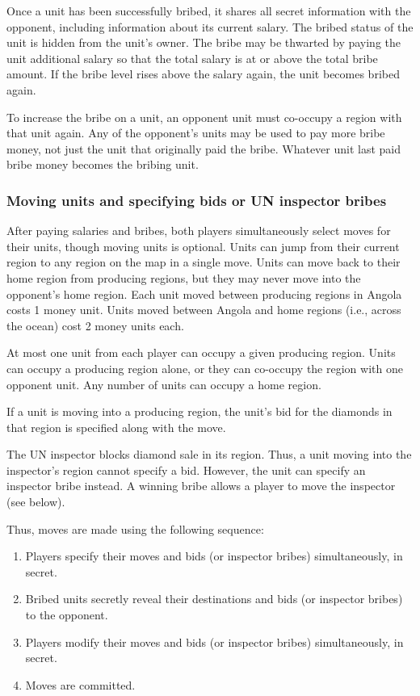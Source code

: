 Once a unit has been successfully bribed, it shares all secret information with the opponent, including information about its current salary.  The bribed status of the unit is hidden from the unit's owner.  The bribe may be thwarted by paying the unit additional salary so that the total salary is at or above the total bribe amount.  If the bribe level rises above the salary again, the unit becomes bribed again. 

To increase the bribe on a unit, an opponent unit must co-occupy a region with that unit again.  Any of the opponent's units may be used to pay more bribe money, not just the unit that originally paid the bribe.  Whatever unit last paid bribe money becomes the bribing unit.

\subsubsection{Moving units and specifying bids or UN inspector bribes}

After paying salaries and bribes, both players simultaneously select moves for their units, though moving units is optional.  Units can jump from their current region to any region on the map in a single move.  Units can move back to their home region from producing regions, but they may never move into the opponent's home region.  Each unit moved between producing regions in Angola costs 1 money unit.  Units moved between Angola and home regions (i.e., across the ocean) cost 2 money units each.

At most one unit from each player can occupy a given producing region.  Units can occupy a producing region alone, or they can co-occupy the region with one opponent unit.  Any number of units can occupy a home region.  

If a unit is moving into a producing region, the unit's bid for the diamonds in that region is specified along with the move.

The UN inspector blocks diamond sale in its region.  Thus, a unit moving into the inspector's region cannot specify a bid.  However, the unit can specify an inspector bribe instead.  A winning bribe allows a player to move the inspector (see below).

Thus, moves are made using the following sequence:
\begin{enumerate}
\item Players specify their moves and bids (or inspector bribes) simultaneously, in secret.
\item Bribed units secretly reveal their destinations and bids (or inspector bribes) to the opponent.
\item Players modify their moves and bids (or inspector bribes) simultaneously, in secret.
\item Moves are committed.
\end{enumerate}

